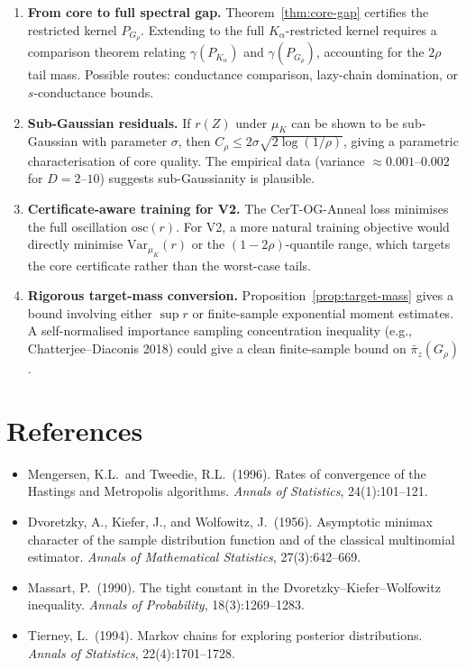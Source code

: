 \documentclass[11pt]{article}
\newcommand{\osc}{\mathrm{osc}}
\begin{document}
\begin{enumerate}[label=(\alph*)]
  \item \textbf{From core to full spectral gap.} Theorem~\ref{thm:core-gap} certifies the restricted kernel $P_{G_\rho}$. Extending to the full $K_\alpha$-restricted kernel requires a comparison theorem relating $\gamma(P_{K_\alpha})$ and $\gamma(P_{G_\rho})$, accounting for the $2\rho$ tail mass. Possible routes: conductance comparison, lazy-chain domination, or $s$-conductance bounds.

  \item \textbf{Sub-Gaussian residuals.} If $r(Z)$ under $\mu_K$ can be shown to be sub-Gaussian with parameter $\sigma$, then $C_\rho \le 2\sigma\sqrt{2\log(1/\rho)}$, giving a parametric characterisation of core quality. The empirical data (variance $\approx 0.001$--$0.002$ for $D=2$--$10$) suggests sub-Gaussianity is plausible.

  \item \textbf{Certificate-aware training for V2.} The CerT-OG-Anneal loss minimises the full oscillation $\osc(r)$. For V2, a more natural training objective would directly minimise $\mathrm{Var}_{\mu_K}(r)$ or the $(1-2\rho)$-quantile range, which targets the core certificate rather than the worst-case tails.

  \item \textbf{Rigorous target-mass conversion.} Proposition~\ref{prop:target-mass} gives a bound involving either $\sup r$ or finite-sample exponential moment estimates. A self-normalised importance sampling concentration inequality (e.g., Chatterjee--Diaconis 2018) could give a clean finite-sample bound on $\bar{\pi}_z(G_\rho)$.
\end{enumerate}


\section*{References}

\begin{itemize}[nosep,leftmargin=*]
  \item Mengersen, K.L.\ and Tweedie, R.L.\ (1996). Rates of convergence of the Hastings and Metropolis algorithms. \emph{Annals of Statistics}, 24(1):101--121.
  \item Dvoretzky, A., Kiefer, J., and Wolfowitz, J.\ (1956). Asymptotic minimax character of the sample distribution function and of the classical multinomial estimator. \emph{Annals of Mathematical Statistics}, 27(3):642--669.
  \item Massart, P.\ (1990). The tight constant in the Dvoretzky--Kiefer--Wolfowitz inequality. \emph{Annals of Probability}, 18(3):1269--1283.
  \item Tierney, L.\ (1994). Markov chains for exploring posterior distributions. \emph{Annals of Statistics}, 22(4):1701--1728.
\end{itemize}
\end{document}
